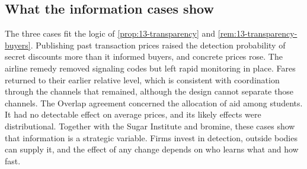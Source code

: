 \subsection{What the information cases show}\label{sec:13-information-lessons}

The three cases fit the logic of \cref{prop:13-transparency} and \cref{rem:13-transparency-buyers}. Publishing
past transaction prices raised the detection probability of secret discounts more than it informed buyers, and
concrete prices rose. The airline remedy removed signaling codes but left rapid monitoring in place. Fares
returned to their earlier relative level, which is consistent with coordination through the channels that remained,
although the design cannot separate those channels. The Overlap agreement concerned the allocation of aid among students. It
had no detectable effect on average prices, and its likely effects were distributional. Together with the Sugar
Institute and bromine, these cases show that information is a strategic variable. Firms invest in detection,
outside bodies can supply it, and the effect of any change depends on who learns what and how fast.

